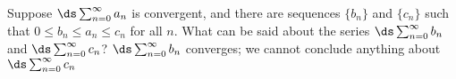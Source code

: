 {Suppose $\ds \sum_{n=0}^\infty a_n$ is convergent, and there are sequences $\{b_n\}$ and $\{c_n\}$ such that $0\leq b_n \leq a_n \leq c_n$ for all $n$. What can be said about the series $\ds \sum_{n=0}^\infty b_n$ and $\ds \sum_{n=0}^\infty c_n$?
}
{$\ds \sum_{n=0}^\infty b_n$ converges; we cannot conclude anything about $\ds \sum_{n=0}^\infty c_n$
}